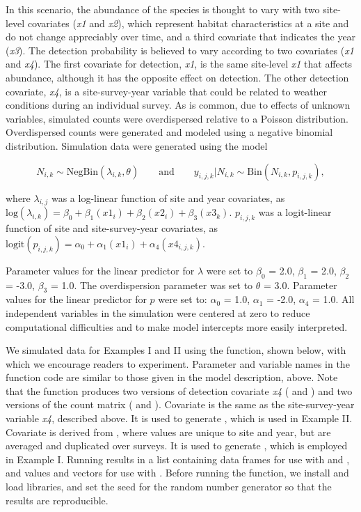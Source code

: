 \documentclass[codesnippet]{jss}
\begin{document}
In this scenario, the abundance of the species is thought to vary with two 
site-level covariates (\textit{x1} and \textit{x2}), which represent habitat 
characteristics at a site and do not change appreciably over time, and a 
third covariate that indicates the year (\textit{x3}). The detection 
probability is believed to vary according to two covariates (\textit{x1} and 
\textit{x4}). The first covariate for detection, \textit{x1}, is the same 
site-level \textit{x1} that affects abundance, although it has the opposite 
effect on detection. The other detection covariate, \textit{x4}, is a 
site-survey-year variable that could be related to weather conditions during 
an individual survey. As is common, due to effects of unknown variables, 
simulated counts were overdispersed relative to a Poisson distribution. 
Overdispersed counts were generated and 
modeled using a negative binomial distribution. Simulation data were 
generated using the model

\begin{equation} \label{eq2}
N_{i,k} \sim \text{NegBin}(\lambda_{i,k}, \theta) \qquad \text{and} \qquad  
y_{i,j,k} | N_{i,k} \sim \text{Bin}(N_{i,k}, p_{i,j,k}),
\end{equation}

where $\lambda_{i,j}$ was a log-linear function of site and year covariates, 
as $\text{log}(\lambda_{i,k}) = \beta_0 + \beta_1 (\textit{x1}_{i}) + 
\beta_2 (\textit{x2}_{i}) + \beta_3 (\textit{x3}_{k})$. $p_{i,j,k}$ was a 
logit-linear function of site and site-survey-year covariates, as 
$\text{logit}(p_{i,j,k}) = \alpha_0 + \alpha_1 (\textit{x1}_{i}) + \alpha_4 
(\textit{x4}_{i,j,k})$.

Parameter values for the linear predictor for $\lambda$ were set to $\beta_0$ = 2.0, $\beta_1$ = 2.0, $\beta_2$ = -3.0, $\beta_3$ = 1.0. The overdispersion parameter was set to $\theta$ = 3.0. Parameter values for the linear predictor for $p$ were set to: $\alpha_0$ = 1.0, $\alpha_1$ = -2.0, $\alpha_4$ = 1.0. All independent variables in the simulation were centered at zero to reduce computational difficulties and to make model intercepts more easily interpreted.

We simulated data for Examples I and II using the  
function, shown below, with which we encourage readers to experiment. 
Parameter and variable names in the function code are similar to those given 
in the model description, above. Note that the function produces two 
versions of detection covariate \textit{x4} ( and ) and 
two versions of the count matrix ( and ). Covariate 
 is the same as the site-survey-year variable \textit{x4}, 
described above. It is used to generate , which is used in Example 
II. Covariate  is derived from , where values are unique 
to site and year, but are averaged and duplicated over surveys. It is used 
to generate , which is employed in Example I. Running 
 results in a list containing data frames for use with 
 and , and values and vectors for use with 
. Before running the function, we install and load libraries, 
and set the seed for the random number generator so that the results are 
reproducible.
\end{document}
